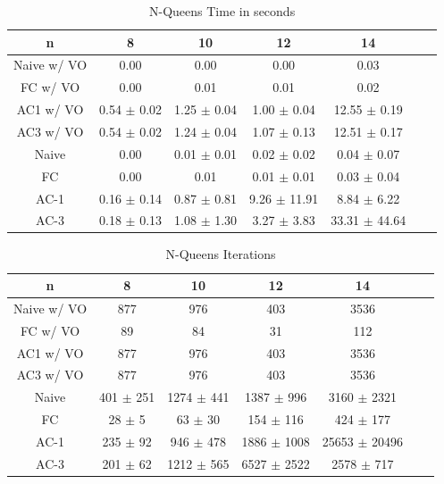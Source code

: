 \begin{table}[h!]
	\centering
	\begin{tabular}{|c|c|c|c|c|c|c|}
		\hline
		n           & 8               & 10              & 12               & 14                \\ \hline
		Naive w/ VO & 0.00            & 0.00            & 0.00             & 0.03              \\ \hline
		FC w/ VO    & 0.00            & 0.01            & 0.01             & 0.02              \\ \hline
		AC1 w/ VO   & 0.54 $\pm$ 0.02 & 1.25 $\pm$ 0.04 & 1.00 $\pm$ 0.04  & 12.55 $\pm$ 0.19  \\ \hline
		AC3 w/ VO   & 0.54 $\pm$ 0.02 & 1.24 $\pm$ 0.04 & 1.07 $\pm$ 0.13  & 12.51 $\pm$ 0.17  \\ \hline
		Naive       & 0.00            & 0.01 $\pm$ 0.01 & 0.02 $\pm$ 0.02  & 0.04 $\pm$ 0.07   \\ \hline
		FC          & 0.00            & 0.01            & 0.01 $\pm$ 0.01  & 0.03 $\pm$ 0.04   \\ \hline
		AC-1        & 0.16 $\pm$ 0.14 & 0.87 $\pm$ 0.81 & 9.26 $\pm$ 11.91 & 8.84 $\pm$ 6.22   \\ \hline
		AC-3        & 0.18 $\pm$ 0.13 & 1.08 $\pm$ 1.30 & 3.27 $\pm$ 3.83  & 33.31 $\pm$ 44.64 \\ \hline
	\end{tabular}
	\caption{N-Queens Time in seconds}
	\label{tab:queens:time}
\end{table}

\begin{table}[h!]
	\centering
	\begin{tabular}{|c|c|c|c|c|c|c|}
		\hline
		n           & 8             & 10             & 12              & 14                \\ \hline
		Naive w/ VO & 877           & 976            & 403             & 3536              \\ \hline
		FC w/ VO    & 89            & 84             & 31              & 112               \\ \hline
		AC1 w/ VO   & 877           & 976            & 403             & 3536              \\ \hline
		AC3 w/ VO   & 877           & 976            & 403             & 3536              \\ \hline
		Naive       & 401 $\pm$ 251 & 1274 $\pm$ 441 & 1387 $\pm$ 996  & 3160 $\pm$ 2321   \\ \hline
		FC          & 28 $\pm$ 5    & 63 $\pm$ 30    & 154 $\pm$ 116   & 424 $\pm$ 177     \\ \hline
		AC-1        & 235 $\pm$ 92  & 946 $\pm$ 478  & 1886 $\pm$ 1008 & 25653 $\pm$ 20496 \\ \hline
		AC-3        & 201 $\pm$ 62  & 1212 $\pm$ 565 & 6527 $\pm$ 2522 & 2578 $\pm$ 717    \\ \hline
	\end{tabular}
	\caption{N-Queens Iterations}
	\label{tab:queens:iterations}
\end{table}

